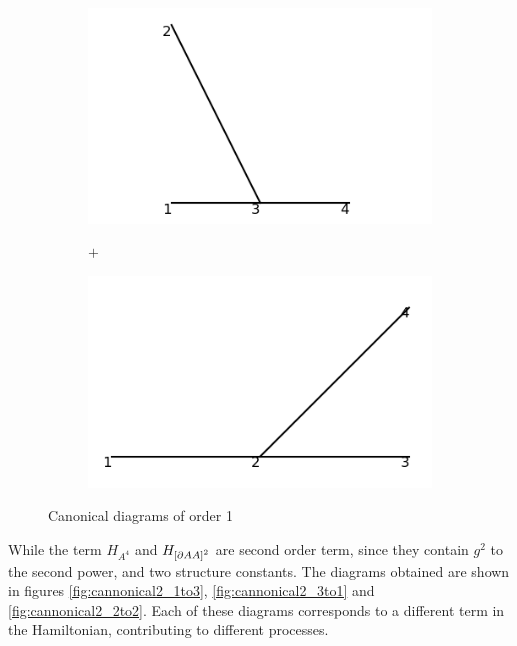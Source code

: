 \documentclass[11pt,a4paper,twoside,pdf]{article}
\numberwithin{equation}{section}
\begin{document}
\begin{figure}[h!]
    \centering
    \begin{subfigure}[t]{0.33\textwidth}
        \centering
        \includegraphics[width=\textwidth]{plots/canonical/order1/1.png}
        \caption{ }
        \label{fig:cannonical1_1}
    \end{subfigure}%
    \begin{subfigure}[t]{0.1\textwidth}
        \centering
        {\LARGE $+$}
    \end{subfigure}
    \begin{subfigure}[t]{0.33\textwidth}
        \centering
        \includegraphics[width=\textwidth]{plots/canonical/order1/2.png}
        \caption{ }
        \label{fig:cannonical1_2}
    \end{subfigure}
    \caption{Canonical diagrams of order 1}
    \label{fig:cannonical1}
\end{figure}

While the term $H_{A^4}$ and $H_{\left[ \partial A A \right]^2}$
are second order term, since they contain $g^2$ to the second power, and two structure constants.
The
diagrams obtained are shown in figures \ref{fig:cannonical2_1to3},
\ref{fig:cannonical2_3to1} and \ref{fig:cannonical2_2to2}. Each of these diagrams
corresponds to a different term in the Hamiltonian, contributing to different processes.
\end{document}
